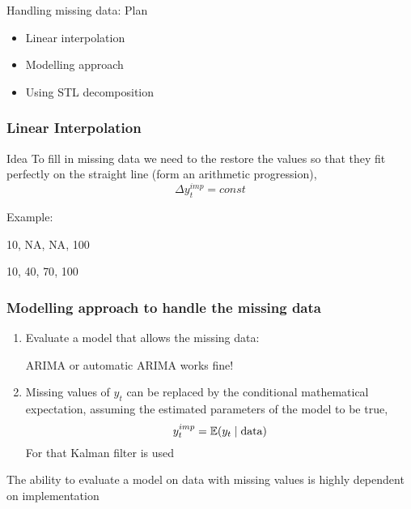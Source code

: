 
\begin{frame} %
	
	
\end{frame}



\begin{frame}{Handling missing data: Plan}
	\begin{itemize}[<+->]
		\item Linear \alert{interpolation}
		\item \alert{Modelling} approach
		\item Using \alert{STL decomposition}
	\end{itemize}
	
\end{frame}


\begin{frame}
	\frametitle{Linear Interpolation}
	
	\begin{block}{Idea}
		To  fill in missing data  we need to the restore the values so that they fit perfectly on the straight line (form an \alert{arithmetic progression}),
		\[
		\Delta y_t^{imp} = const
		\]
	\end{block}
	\pause
	
	Example:
	
	10, \alert{NA}, \alert{NA}, 100
	
	\pause
	
	10, \alert{40}, \alert{70}, 100
	
\end{frame}


\begin{frame}
	\frametitle{Modelling approach to handle the missing data}
	
	\begin{enumerate}[<+->]
		\item Evaluate a model that \alert{allows} the missing data:
		
		ARIMA or automatic ARIMA works fine!

		\item Missing values of $y_t$ can be replaced by the conditional mathematical expectation,
		assuming the estimated parameters of the model to be true,
		\[
		y_t^{imp} = \mathbb{E}(y_t \mid \text{data})
		\]
		For that \alert{Kalman filter} is used
	\end{enumerate}
	
	\pause
	The ability to evaluate a model on data with missing values is highly dependent on \alert{implementation}
	
\end{frame}

